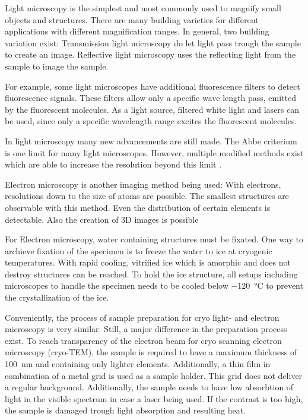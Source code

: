 

Light microscopy is the simplest and most commonly used to magnify small objects and structures. There are many building varieties for different applications with different magnification ranges. In general, two building variation exist: Transmission light microscopy do let light pass trough the sample to create an image. Reflective light microscopy uses the reflecting light from the sample to image the sample. 

For example, some light microscopes have additional fluorescence filters to detect fluorescence signals. These filters allow only a specific wave length pass, emitted by the fluorescent molecules. As a light source, filtered white light and lasers can be used, since only a specific wavelength range excites the fluorescent molecules.

In light microscopy many new advancements are still made. The Abbe criterium is one limit for many light microscopes. However, multiple modified methods exist which are able to increase the resolution beyond this limit \cite{Heintzmann.2006}.

Electron microscopy is another imaging method being used: With electrons, resolutions down to the size of atoms are possible. The smallest structures are observable with this method. Even the distribution of certain elements is detectable. Also the creation of 3D images is possible

For Electron microscopy, water containing structures must be fixated. One way to archieve fixation of the specimen is to freeze the water to ice at cryogenic temperatures. With rapid cooling, vitrified ice which is amorphic and does not destroy structures can be reached. To hold the ice structure, all setups including microscopes to handle the specimen needs to be cooled below \SI{-120}{\degreeCelsius} to prevent the crystallization of the ice.

Conveniently, the process of sample preparation for cryo light- and electron microscopy is very similar. Still, a major difference in the preparation process exist. To reach transparency of the electron beam for cryo scanning electron microscopy (cryo-TEM), the sample is required to have a maximum thickness of \SI{100}{\nano\meter} and containing only lighter elements. Additionally, a thin film in combination of a metal grid is used as a sample holder. This grid does not deliver a regular background. Additionally, the sample needs to have low absorbtion of light in the visible spectrum in case a laser being used. If the contrast is too high, the sample is damaged trough light absorption and resulting heat.

